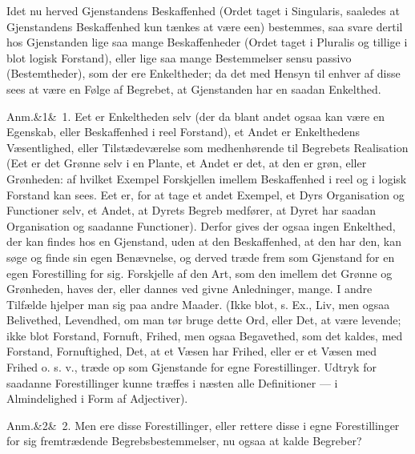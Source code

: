 \documentclass[12pt]{book}
\def\sperr#1{#1}%
\def\textit#1{#1}%
\def\emph#1{#1}%
\newcommand{\sperr}[1]{\textls[180]{#1}}
\newcommand{\anm}[1]{%
  \par\vspace{0.5\baselineskip}%
  \noindent\hspace{\parindent}\sperr{Anm.}\ifx&#1&\else~\textit{#1}.\fi
  \enspace\ignorespaces
}
\newcommand{\opage}[1]{\marginnote{\footnotesize\textit{[#1]}}}
\begin{document}
Idet nu herved Gjenstandens \emph{Beskaffenhed} (Ordet taget i Singularis,
saaledes at Gjenstandens Beskaffenhed kun tænkes at være een) bestemmes, saa
svare dertil hos Gjenstanden lige saa mange \emph{Beskaffenheder} (Ordet taget i
\opage{98} Pluralis og tillige i blot logisk Forstand), eller lige saa mange Bestemmelser
\textit{sensu passivo} (Bestemtheder), som der ere Enkeltheder; da det med Hensyn
til enhver af disse sees at være en Følge af Begrebet, at Gjenstanden har en
saadan Enkelthed.

\anm{1} Eet er Enkeltheden selv (der da blant andet ogsaa kan være en Egenskab,
eller Beskaffenhed i reel Forstand), et Andet er Enkelthedens Væsentlighed, eller
Tilstædeværelse som medhenhørende til Begrebets Realisation (Eet er det Grønne
selv i en Plante, et Andet er det, at den er grøn, eller Grønheden: af hvilket
Exempel Forskjellen imellem Beskaffenhed i reel og i logisk Forstand kan sees.
Eet er, for at tage et andet Exempel, et Dyrs Organisation og Functioner selv, et
Andet, at Dyrets Begreb medfører, at Dyret har saadan Organisation og saadanne
Functioner). Derfor gives der ogsaa ingen Enkelthed, der kan findes hos en
Gjenstand, uden at den Beskaffenhed, at den har den, kan søge og finde sin egen
Benævnelse, og derved træde frem som Gjenstand for en egen Forestilling for sig.
Forskjelle af den Art, som den imellem det Grønne og Grønheden, haves der, eller
dannes ved givne Anledninger, mange. I andre Tilfælde hjelper man sig paa andre
Maader. (Ikke blot, s. Ex., Liv, men ogsaa Belivethed, Levendhed, om man tør
bruge dette Ord, eller Det, at være levende; ikke blot Forstand, Fornuft, Frihed,
men ogsaa Begavethed, som det kaldes, med
\opage{99} %
Forstand, Fornuftighed, Det, at et Væsen har Frihed, eller er et Væsen med Frihed
o. s. v., træde
op som Gjenstande for egne Forestillinger. Udtryk for saadanne Forestillinger
kunne træffes i næsten alle Definitioner --- i Almindelighed i Form af
Adjectiver).

\anm{2} Men ere disse Forestillinger, eller rettere disse i egne Forestillinger
for sig fremtrædende Begrebsbestemmelser, nu ogsaa at kalde Begreber?
\end{document}

